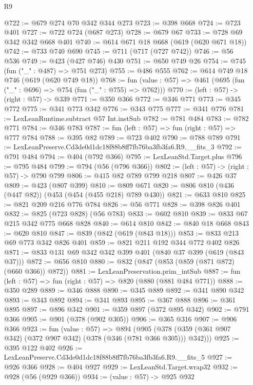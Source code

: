 \begin{lexlean}{R9}
\begin{coremodule}
@722 := @679 @274 @70 @342 @344 @273
@723 := @398 @668
@724 := @723 @401
@727 := @722 @724 (@687 @273)
@728 := @679 @67
@733 := @728 @69 @342 @342 @668 @401
@740 := @614 @671 @18 @668 (@619 (@620 @671 @18))
@742 := @733 @740 @690
@745 := @711 (@717 (@727 @742))
@746 := @56 @536
@749 := @423 (@427 @746) @430
@751 := @650 @749 @26
@754 := @745 (fun ("_" : @487) => @751 @273)
@755 := @486 @555
@762 := @614 @749 @18 @746 (@619 (@620 @749 @18))
@768 := fun (value : @57) => @461 (@695 (fun ("_" : @696) => @754 (fun ("_" : @755) => @762)))
@770 := (left : @57) -> (right : @57) -> @339
@771 := @350 @366
@772 := @346 @771
@773 := @345 @772
@775 := @341 @773 @342
@776 := @343 @775
@777 := @341 @776
@781 := LexLeanRuntime.subtract @57 Int.instSub
@782 := @781 @484
@783 := @782 @771
@784 := @346 @783
@787 := fun (left : @57) => fun (right : @57) => @777 @784
@788 := @395 @82
@789 := @723 @402
@790 := @788 @789
@791 := LexLeanPreserve.Cd3de0d1dc18f88b8ff7fb76ba3fb3fa6.R9.__fits_3
@792 := @791 @484
@794 := @404 (@792 @366)
@795 := LexLeanStd.Target.plus
@796 := @795 @484
@799 := @794 (@56 (@796 @366))
@802 := (left : @57) -> (right : @57) -> @790 @799
@806 := @415 @82 @789 @799 @218
@807 := @426 @37
@809 := @423 (@807 @399)
@810 := @809 @671
@820 := @806 @810 (@436 (@447 @82)) (@453 (@454 (@455 @218) @789 @430))
@821 := @633 @810
@825 := @821 @209 @216 @776 @784
@826 := @56 @771
@828 := @398 @826 @401
@832 := @825 (@723 @828) (@56 @783)
@833 := @602 @810
@839 := @833 @67 @215 @342 @775 @668 @828
@840 := @614 @810
@842 := @840 @18 @668
@843 := @620 @810
@847 := @839 (@842 (@619 (@843 @18)))
@853 := @833 @213 @69 @773 @342 @826 @401
@859 := @821 @211 @192 @344 @772 @402 @826
@871 := @833 @131 @69 @342 @342 @399 @401 (@840 @37 @399 (@619 (@843 @37)))
@872 := @656 @810
@880 := @832 (@847 (@853 (@859 (@871 @872) (@660 @366)) @872))
@881 := LexLeanPreservation.prim_intSub
@887 := fun (left : @57) => fun (right : @57) => @820 (@880 (@881 @484 @771))
@888 := @350 @289
@889 := @346 @888
@890 := @345 @889
@892 := @341 @890 @342
@893 := @343 @892
@894 := @341 @893
@895 := @367 @888
@896 := @361 @895
@897 := @896 @342
@901 := @359 @897 (@372 @895 @342)
@902 := @791 @366
@905 := @901 (@378 (@902 @305))
@906 := @365 @316
@907 := @906 @366
@923 := fun (value : @57) =>
  @894 (@905 (@378 (@359 (@361 @907 @342) (@372 @907 @342) (@378 (@346 (@781 @366 @305))) @342)))
@925 := @395 @122 @402
@926 := LexLeanPreserve.Cd3de0d1dc18f88b8ff7fb76ba3fb3fa6.R9.__fits_5
@927 := @926 @366
@928 := @404 @927
@929 := LexLeanStd.Target.wrap32
@932 := @928 (@56 (@929 @366))
@934 := (value : @57) -> @925 @932

\end{coremodule}
\end{lexlean}

